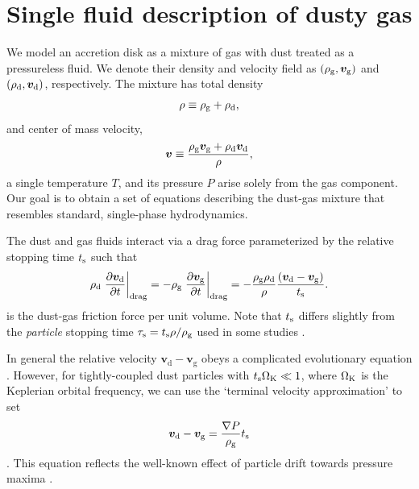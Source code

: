 \section{Single fluid description of dusty gas}\label{setup} 
We model an accretion disk as a mixture of gas with dust treated as a 
pressureless fluid. We denote their density and
velocity field as $(\rho_\mathrm{g},\bm{v}_\mathrm{g})$ and
$(\rho_\mathrm{d},\bm{v}_\mathrm{d})$, respectively. The 
mixture has total density \begin{align}
  \rho \equiv \rho_\mathrm{g} + \rho_\mathrm{d},
\end{align}
and center of mass velocity, 
\begin{align}
  \bm{v} \equiv \frac{\rho_\mathrm{g}\bm{v}_\mathrm{g} + 
    \rho_\mathrm{d}\bm{v}_\mathrm{d}}{\rho}, 
\end{align}
a single temperature $T$, and its pressure $P$ arise solely from the  
gas component. Our goal is to obtain a set of equations
describing the dust-gas mixture that resembles standard, single-phase
hydrodynamics. 


The dust and gas fluids interact via a drag force parameterized by the relative stopping 
time $t_\mathrm{s}$ such that 
\begin{align}  
  \rho_\mathrm{d}\left.\frac{\partial \bm{v}_\mathrm{d}}{\partial t}\right|_\mathrm{drag}= -
  \rho_\mathrm{g}\left.\frac{\partial \bm{v}_\mathrm{g}}{\partial t}\right|_\mathrm{drag}=
  - \frac{\rho_\mathrm{g}\rho_\mathrm{d}}{\rho}\frac{\left(\bm{v}_\mathrm{d} - \bm{v}_\mathrm{g}\right)}{t_\mathrm{s}}. 
\end{align}
is the dust-gas friction force per unit volume.%
 Note that $t_\mathrm{s}$ 
differs slightly from the \emph{particle} stopping time $\tau_\mathrm{s} =
t_\mathrm{s}\rho/\rho_\mathrm{g}$ used in some studies
\citep[e.g.][]{youdin05a}. 

In general the relative velocity $\bm{v}_\mathrm{d} -
\bm{v}_\mathrm{g}$ obeys a complicated evolutionary equation 
\citep[see, e.g.][]{youdin05a}. %
 However, for tightly-coupled dust
particles with $t_\mathrm{s}\Omega_{\rm K}\ll 1 $, where $\Omega_{\rm K}$ is the Keplerian orbital
frequency, we can use the 
`terminal velocity approximation' to set %
\begin{align}
  \bm{v}_\mathrm{d} - \bm{v}_\mathrm{g} = \frac{\nabla
    P}{\rho_\mathrm{g}}t_\mathrm{s} 
\end{align}
\citep{jacquet11}. This equation reflects the well-known effect of 
particle drift towards pressure maxima \citep{weidenschilling77}. 

